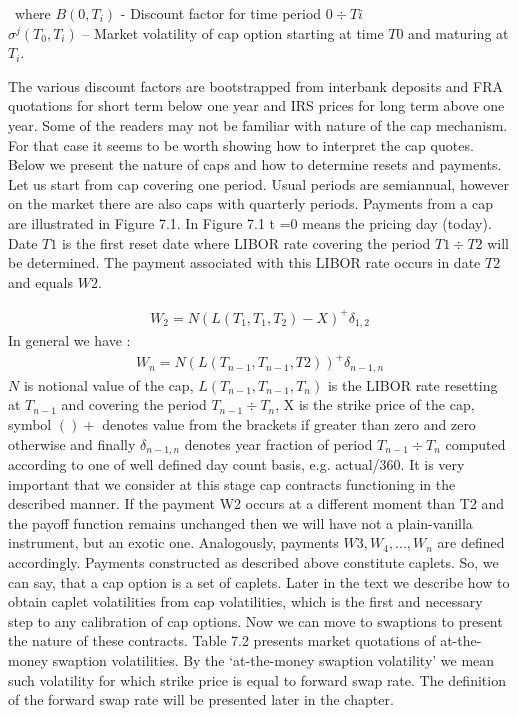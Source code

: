 \documentclass[11pt]{article}
\numberwithin{equation}{subsection}
\begin{document}
\vskip 0.4cm\
where \(B(0, T_i)\) - Discount factor for time period \(0÷Ti\)\\
\(\sigma^{j}(T_0, T_i)\) – Market volatility of cap option starting at time \(T0\) and maturing at \(T_i\).

The various discount factors are bootstrapped from interbank deposits and FRA quotations
for short term below one year and IRS prices for long term above one year.
Some of the readers may not be familiar with nature of the cap mechanism. For that case
it seems to be worth showing how to interpret the cap quotes.
Below we present the nature of caps and how to determine resets and payments. Let us
start from cap covering one period. Usual periods are semiannual, however on the market
there are also caps with quarterly periods. Payments from a cap are illustrated in Figure 7.1.
In Figure 7.1 t =0 means the pricing day (today). Date \(T1\) is the first reset date where
LIBOR rate covering the period \(T1÷T2\) will be determined. The payment associated with
this LIBOR rate occurs in date \(T2\) and equals \(W2\).

\begin{eqnarray*}
	W_2 = N(L(T_1, T_1, T_2)-X)^{+} \delta_{1,2}
\end{eqnarray*}
In general we have :
\begin{eqnarray*}
	W_n = N(L(T_{n-1}, T_{n-1}, T2))^{+} \delta_{n-1, n}
\end{eqnarray*}
\(N\) is notional value of the cap, \(L(T_{n-1}, T_{n-1}, T_n)\) is the LIBOR rate resetting at \(T_{n−1}\)
and covering the period \(T_{n−1}÷T_{n} \), X is the strike price of the cap, symbol \(()+\) denotes value from the brackets if greater than zero and zero otherwise and finally \(\delta_{n-1, n}\) denotes year fraction of period \(T_{n−1}÷T_n\)
computed according to one of well defined day count basis, e.g. actual/360.
It is very important that we consider at this stage cap contracts functioning in the described
manner. If the payment W2 occurs at a different moment than T2 and the payoff function
remains unchanged then we will have not a plain-vanilla instrument, but an exotic one.
Analogously, payments \(W3, W_4,...,W_n\) are defined accordingly.
Payments constructed as described above constitute caplets. So, we can say, that a cap
option is a set of caplets. Later in the text we describe how to obtain caplet volatilities from
cap volatilities, which is the first and necessary step to any calibration of cap options.
Now we can move to swaptions to present the nature of these contracts. Table 7.2 presents
market quotations of at-the-money swaption volatilities. By the ‘at-the-money swaption
volatility’ we mean such volatility for which strike price is equal to forward swap rate. The
definition of the forward swap rate will be presented later in the chapter.
\end{document}
